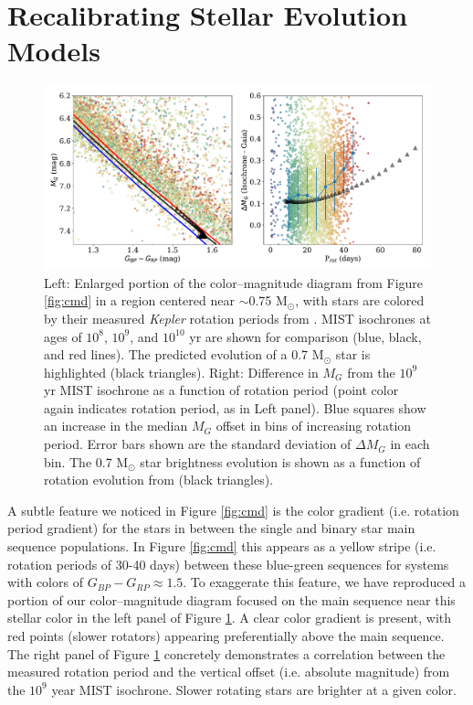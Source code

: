 \documentclass[preprint2]{aastex62}
\newcommand{\Kepler}{\textsl{Kepler}\xspace}
\begin{document}
\section{Recalibrating Stellar Evolution Models}


\begin{figure}
\centering
\includegraphics[width=6in]{../figures/cmd_zoom}
\caption{
Left: Enlarged portion of the color--magnitude diagram from Figure \ref{fig:cmd} in a region centered near $\sim$0.75 M$_\odot$, with stars are colored by their measured \Kepler rotation periods from \citet{mcquillan2014}.
MIST isochrones at ages of $10^8$, $10^9$, and $10^{10}$ yr are shown for comparison (blue, black, and red lines). The predicted evolution of a 0.7 M$_\odot$ star is highlighted (black triangles). 
Right: Difference in $M_G$ from the $10^9$ yr MIST isochrone as a function of rotation period (point color again indicates rotation period, as in Left panel). Blue squares show an increase in the median $M_G$ offset in bins of increasing rotation period. Error bars shown are the standard deviation of $\Delta M_G$ in each bin. The 0.7 M$_\odot$ star brightness evolution is shown as a function of rotation evolution from \citet{meibom2009} (black triangles).
}
\label{fig:cmd_zoom}
\end{figure}

A subtle feature we noticed in Figure \ref{fig:cmd} is the color gradient (i.e. rotation period gradient) for the stars in between the single and binary star main sequence populations. In Figure \ref{fig:cmd} this appears as a yellow stripe (i.e. rotation periods of 30-40 days) between these blue-green sequences for systems with colors of $G_{BP} - G_{RP} \approx 1.5$. To exaggerate this feature, we have reproduced a portion of our color--magnitude diagram focused on the main sequence near this stellar color in the left panel of Figure \ref{fig:cmd_zoom}. A clear color gradient is present, with red points (slower rotators) appearing preferentially above the main sequence.
The right panel of Figure \ref{fig:cmd_zoom} concretely demonstrates a correlation between the measured rotation period and the vertical offset (i.e. absolute magnitude) from the $10^9$ year MIST isochrone. Slower rotating stars are brighter at a given color.
\end{document}
